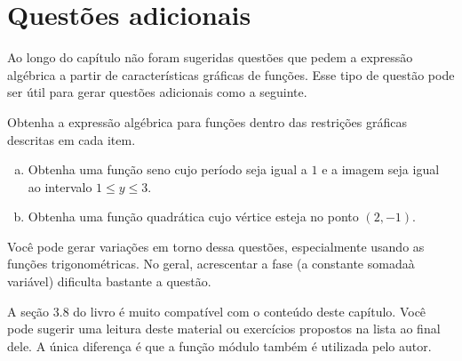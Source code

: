 \documentclass[main_estudante.tex]{subfiles}
\begin{document}
\section{Questões adicionais}

Ao longo do capítulo não foram sugeridas questões que pedem a expressão algébrica a partir de características gráficas de funções. Esse tipo de questão pode ser útil para gerar questões adicionais como a seguinte.

\begin{questao}
Obtenha a expressão algébrica para funções dentro das restrições gráficas descritas em cada item.
\begin{enumerate}[a)]
\item Obtenha uma função seno cujo período seja igual a $1$ e a imagem seja igual ao intervalo $1 \leq y \leq 3$.
\item Obtenha uma função quadrática cujo vértice esteja no ponto $(2,-1)$.
\end{enumerate}
\end{questao}

Você pode gerar variações em torno dessa questões, especialmente usando as funções trigonométricas. No geral, acrescentar a fase (a constante somadaà variável) dificulta bastante a questão.

A seção 3.8 do livro  é muito compatível com o conteúdo deste capítulo. Você pode sugerir uma leitura deste material ou exercícios propostos na lista ao final dele. A única diferença é que a função módulo também é utilizada pelo autor.
\end{document}
